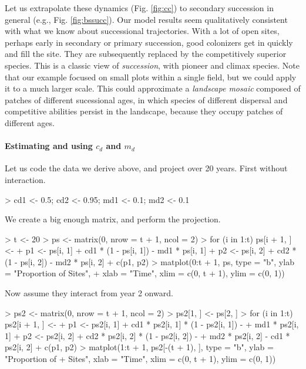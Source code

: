 Let us extrapolate these dynamics (Fig. \ref{fig:cc}) to secondary succession in general (e.g., Fig. \ref{fig:bssucc}). Our model results seem qualitatively consistent with what we know about successional trajectories. With a lot of open sites, perhaps early in secondary or primary succession, good colonizers get in quickly and fill the site. They are subsequently replaced by the competitively superior species. This is a classic view of \emph{succession}, with pioneer and climax species. Note that our example focused on small plots within a single field, but we could apply it to a much larger scale. This could approximate a \emph{landscape mosaic} composed of patches of different sucessional ages, in which species of different dispersal and competitive abilities persist in the landscape, because they occupy patches of different ages. 


\medskip \noindent
\begin{boxedminipage}{\linewidth}
  {\footnotesize
\paragraph{Estimating and using $c_d$ and $m_d$} 
Let us code the data we derive above, and project over 20 years. First without interaction.
\begin{Schunk}
\begin{Sinput}
> cd1 <- 0.5; cd2 <- 0.95; md1 <- 0.1; md2 <- 0.1
\end{Sinput}
\end{Schunk}
We create a big enough matrix, and perform the projection.
\begin{Schunk}
\begin{Sinput}
> t <- 20
> ps <- matrix(0, nrow = t + 1, ncol = 2)
> for (i in 1:t) ps[i + 1, ] <- {
+     p1 <- ps[i, 1] + cd1 * (1 - ps[i, 1]) - md1 * ps[i, 1]
+     p2 <- ps[i, 2] + cd2 * (1 - ps[i, 2]) - md2 * ps[i, 2]
+     c(p1, p2)  }
> matplot(0:t + 1, ps, type = "b", ylab = "Proportion of Sites", 
+     xlab = "Time", xlim = c(0, t + 1), ylim = c(0, 1))
\end{Sinput}
\end{Schunk}
Now assume they interact from year 2 onward.
\begin{Schunk}
\begin{Sinput}
> ps2 <- matrix(0, nrow = t + 1, ncol = 2)
> ps2[1, ] <- ps[2, ]
> for (i in 1:t) ps2[i + 1, ] <- {
+     p1 <- ps2[i, 1] + cd1 * ps2[i, 1] * (1 - ps2[i, 1]) - 
+         md1 * ps2[i, 1]
+     p2 <- ps2[i, 2] + cd2 * ps2[i, 2] * (1 - ps2[i, 2]) - 
+         md2 * ps2[i, 2] - cd1 * ps2[i, 2]
+     c(p1, p2)   }
> matplot(1:t + 1, ps2[-(t + 1), ], type = "b", ylab = "Proportion of
+     Sites", xlab = "Time", xlim = c(0, t + 1), ylim = c(0, 1))
\end{Sinput}
\end{Schunk}
}
\end{boxedminipage} \medskip

